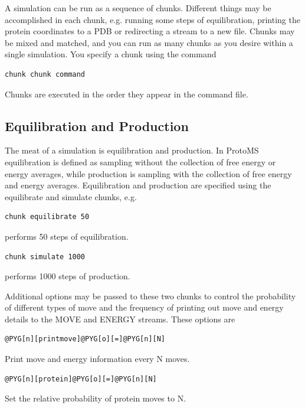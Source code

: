 \documentclass[letterpaper,10pt,english]{manual}
\begin{document}
A simulation can be run as a sequence of chunks. Different things may be accomplished in each chunk, e.g. running some steps of equilibration, printing the protein coordinates to a PDB or redirecting a stream to a new file. Chunks may be mixed and matched, and you can run as many chunks as you desire within a single simulation. You specify a chunk using the command

\begin{Verbatim}[commandchars=@\[\]]
chunk chunk command
\end{Verbatim}

Chunks are executed in the order they appear in the command file.


\subsection{Equilibration and Production}

The meat of a simulation is equilibration and production. In ProtoMS equilibration is defined as sampling without the collection of free energy or energy averages, while production is sampling with the collection of free energy and energy averages. Equilibration and production are specified using the equilibrate and simulate chunks, e.g.
\begin{Verbatim}[commandchars=@\[\]]
chunk equilibrate 50
\end{Verbatim}

performs 50 steps of equilibration.
\begin{Verbatim}[commandchars=@\[\]]
chunk simulate 1000
\end{Verbatim}

performs 1000 steps of production.

Additional options may be passed to these two chunks to control the probability of different types of move and the frequency of printing out move and energy details to the MOVE and ENERGY streams. These options are
\begin{Verbatim}[commandchars=@\[\]]
@PYG[n][printmove]@PYG[o][=]@PYG[n][N]
\end{Verbatim}

Print move and energy information every N moves.

\begin{Verbatim}[commandchars=@\[\]]
@PYG[n][protein]@PYG[o][=]@PYG[n][N]
\end{Verbatim}

Set the relative probability of protein moves to N.
\end{document}
